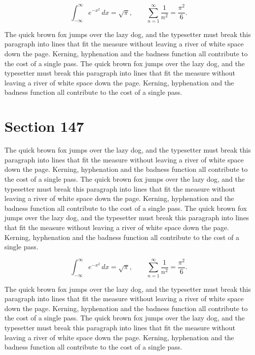 \documentclass{article}
\begin{document}
\begin{equation}
\int_{-\infty}^{\infty} e^{-x^{2}}\,dx = \sqrt{\pi}, \qquad
\sum_{n=1}^{\infty} \frac{1}{n^{2}} = \frac{\pi^{2}}{6}.
\end{equation}

The quick brown fox jumps over the lazy dog, and the typesetter must break this paragraph into lines that fit the measure without leaving a river of white space down the page. Kerning, hyphenation and the badness function all contribute to the cost of a single pass. The quick brown fox jumps over the lazy dog, and the typesetter must break this paragraph into lines that fit the measure without leaving a river of white space down the page. Kerning, hyphenation and the badness function all contribute to the cost of a single pass. 
\section{Section 147}
The quick brown fox jumps over the lazy dog, and the typesetter must break this paragraph into lines that fit the measure without leaving a river of white space down the page. Kerning, hyphenation and the badness function all contribute to the cost of a single pass. The quick brown fox jumps over the lazy dog, and the typesetter must break this paragraph into lines that fit the measure without leaving a river of white space down the page. Kerning, hyphenation and the badness function all contribute to the cost of a single pass. The quick brown fox jumps over the lazy dog, and the typesetter must break this paragraph into lines that fit the measure without leaving a river of white space down the page. Kerning, hyphenation and the badness function all contribute to the cost of a single pass. 

\begin{equation}
\int_{-\infty}^{\infty} e^{-x^{2}}\,dx = \sqrt{\pi}, \qquad
\sum_{n=1}^{\infty} \frac{1}{n^{2}} = \frac{\pi^{2}}{6}.
\end{equation}

The quick brown fox jumps over the lazy dog, and the typesetter must break this paragraph into lines that fit the measure without leaving a river of white space down the page. Kerning, hyphenation and the badness function all contribute to the cost of a single pass. The quick brown fox jumps over the lazy dog, and the typesetter must break this paragraph into lines that fit the measure without leaving a river of white space down the page. Kerning, hyphenation and the badness function all contribute to the cost of a single pass. 
\end{document}
